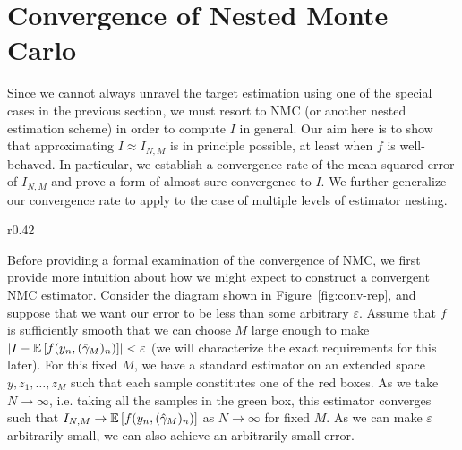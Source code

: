 
\section{Convergence of Nested Monte Carlo}
\label{sec:convergence}

Since we cannot always unravel the target estimation using one of the special cases in the previous section, we must resort to NMC (or another nested estimation scheme) in order to compute $I$ in general. 
Our aim here is to show that
approximating $I \approx I_{N,M}$ is in principle possible, at least when $f$ is
well-behaved. In particular, we establish a convergence rate of 
the mean squared error of $I_{N,M}$ and prove a form of almost sure convergence to
$I$.  We further generalize our convergence rate to apply to the case of multiple
levels of estimator nesting.

\begin{wrapfigure}{r}{0.42\textwidth}
	\centering 
	\resizebox{.4\textwidth}{!}{
		
	}
	\caption{Convergence representation \label{fig:conv-rep}}
	\vspace{-10pt}
\end{wrapfigure}


Before providing a formal examination of the convergence of NMC, we first provide more
intuition about how we might expect to construct a convergent NMC estimator.  Consider the
diagram shown in Figure~\ref{fig:conv-rep}, and suppose that we want our error to be
less than some arbitrary $\varepsilon$.  Assume that $f$ is sufficiently smooth 
that we can choose $M$ large enough to make
$\left|I-\mathbb{E}\left[f(y_n,(\hat{\gamma}_M)_n)\right]\right| < \varepsilon$
(we will characterize the exact requirements for this later).  For this fixed
$M$, we have a standard \mc estimator on an extended space $y,z_1,\dots,z_M$ such that each
sample constitutes one of the red boxes.  As we take $N\rightarrow \infty$, i.e. taking
all the samples in the green box, this estimator converges such that $I_{N,M}
\to \mathbb{E}\left[f(y_n,(\hat{\gamma}_M)_n)\right]$ as $N \to \infty$ for fixed $M$.  As we can
make $\varepsilon$ arbitrarily small, we can also achieve an arbitrarily small error.

